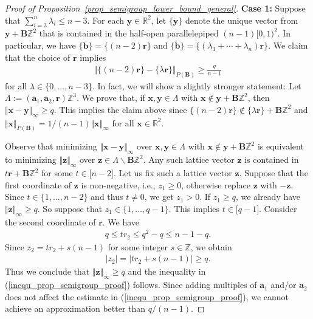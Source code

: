 \documentclass[10pt,a4paper]{amsart}
\newcommand{\R}{\mathbb{R}}
\newcommand{\Z}{\mathbb{Z}}
\newcommand{\bB}{\bm{B}}
\newcommand{\ba}{\bm{a}}
\newcommand{\bb}{\bm{b}}
\newcommand{\br}{\bm{r}}
\newcommand{\bx}{\bm{x}}
\newcommand{\by}{\bm{y}}
\newcommand{\bz}{\bm{z}}
\begin{document}
\begin{proof}[Proof of Proposition~\ref{prop_semigroup_lower_bound_general}]
		\textbf{Case 1:} Suppose that $\sum_{i=3}^n\lambda_i \leq n-3$.  
		For each $\by\in \R^2$, let $\lbrace\by\rbrace$ denote the unique vector from $\by + \bB\Z^2$ that is contained in the half-open parallelepiped $(n-1)\lbrack 0,1 )^2$. 
		In particular, we have $\lbrace\bb\rbrace = \lbrace (n-2)\br\rbrace$ and $\lbrace\tilde{\bb}\rbrace = \lbrace(\lambda_3+ \cdots+ \lambda_n)\br\rbrace$.  
		We claim that the choice of $\br$ implies 
		\begin{align}
			\label{inequ_prop_semigroup_proof}
			\Vert \lbrace(n-2)\br\rbrace - \lbrace\lambda\br\rbrace\Vert_{P(\bB)} \geq \frac{q}{n-1}
		\end{align}
		for all $\lambda\in\lbrace 0,\ldots, n-3\rbrace$. 
		In fact, we will show a slightly stronger statement: Let $\Lambda := (\ba_1,\ba_2,\br)\Z^3$. We prove that, if $\bx,\by\in \Lambda$ with $\bx\notin \by + \bB\Z^2$, then $\Vert \bx-\by\Vert_\infty\geq q$. This implies the claim above since $\lbrace(n-2)\br\rbrace\notin \lbrace\lambda\br\rbrace + \bB\Z^2$ and 
		$\Vert\bx\Vert_{P(\bB)} = 1/(n-1)\Vert\bx\Vert_\infty$ for all $\bx\in\R^2$. 
		
		Observe that minimizing $\Vert \bx-\by\Vert_\infty$ over $\bx,\by\in \Lambda$ with $\bx\notin \by + \bB\Z^2$ is equivalent to minimizing $\Vert \bz\Vert_\infty$ over $\bz\in\Lambda\backslash \bB\Z^2$. Any such lattice vector $\bz$ is contained in $t\br + \bB\Z^2$ for some $t\in\lbrack n-2\rbrack$. Let us fix such a lattice vector $\bz$. Suppose that the first coordinate of $\bz$ is non-negative, i.e., $z_1 \geq 0$, otherwise replace $\bz$ with $-\bz$. Since $t\in\lbrace 1,\ldots,n-2\rbrace$ and thus $t \neq 0$, we get $z_1 > 0$. If $z_1 \geq q$, we already have $\Vert\bz\Vert_\infty\geq q$. So suppose that $z_1 \in\lbrace 1,\ldots,q-1\rbrace$. This implies $t\in\lbrack q-1\rbrack$. 
		Consider the second coordinate of $\br$. We have
		\begin{align*}
			q \leq tr_2 \leq q^2 - q \leq n - 1 - q.
		\end{align*}
		Since $z_2 = tr_2 + s (n-1)$ for some integer $s\in\Z$, we obtain 
		\begin{align*}
			|z_2| = |tr_2 + s (n-1)|\geq q.
		\end{align*}
		Thus we conclude that $\Vert \bz\Vert_\infty\geq q$ and the inequality in (\ref{inequ_prop_semigroup_proof}) follows. Since adding multiples of $\ba_1$ and/or $\ba_2$ does not affect the estimate in (\ref{inequ_prop_semigroup_proof}), 
		we cannot achieve an approximation better than $q/(n-1)$.
		

\end{proof}
\end{document}
